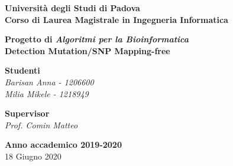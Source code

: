 \documentclass[11pt]{article}
\theoremstyle{definition}
\begin{document}

\begin{titlepage}
   \begin{center}
       	\vspace*{1cm}

	   	\textbf{\Large Università degli Studi di Padova\\
				\Large Corso di Laurea Magistrale in Ingegneria Informatica}

		\vspace{5cm}
		\textbf{\huge Progetto di \textit{Algoritmi per la Bioinformatica}\\}
		\vspace{0.5cm}
      	\textbf{\huge Detection Mutation/SNP Mapping-free} 

           
       	\vspace{4cm}

		\begin{Large}
			\begin{flushright}
				\textbf{Studenti\\}
				\textit{Barisan Anna - 1206600\\ Milia Mikele - 1218949}
			\end{flushright}
		\end{Large}
		
       \begin{Large}
			\begin{flushleft}
				\textbf{Supervisor\\}
				\textit{Prof. Comin Matteo}
			\end{flushleft}
		\end{Large}

       \vfill
            
       \textbf{Anno accademico 2019-2020}\\
       18 Giugno 2020
            
       \vspace{0.8cm}
    

\end{center}
\end{titlepage}
\end{document}
